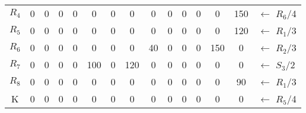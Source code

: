 \documentclass[12pt]{article}
\begin{document}
\begin{enumerate}
\begin{tabular}{|c|c|c|c|c|c|c|c|c|c|c|c|c|c|l}
$R_4$ & 0  & {\color[HTML]{000000} 0}        & {\color[HTML]{000000} 0}        & {\color[HTML]{000000} 0}        & {\color[HTML]{000000} 0}   & {\color[HTML]{000000} 0}   & {\color[HTML]{000000} 0}   & {\color[HTML]{000000} 0}  & {\color[HTML]{000000} 0}   & {\color[HTML]{000000} 0}   & {\color[HTML]{000000} 0}   & {\color[HTML]{000000} 0}   & {\color[HTML]{000000} 150} & ${\leftarrow}$ $R_6$/4 \\ \cline{1-14}
$R_5$ & 0  & {\color[HTML]{000000} 0}        & {\color[HTML]{000000} 0}        & {\color[HTML]{000000} 0}        & {\color[HTML]{000000} 0}   & {\color[HTML]{000000} 0}   & {\color[HTML]{000000} 0}   & {\color[HTML]{000000} 0}  & {\color[HTML]{000000} 0}   & {\color[HTML]{000000} 0}   & {\color[HTML]{000000} 0}   & {\color[HTML]{000000} 0}   & {\color[HTML]{FE0000} 120} & ${\leftarrow}$ $R_1$/3 \\ \cline{1-14}
$R_6$ & 0  & {\color[HTML]{000000} 0}        & {\color[HTML]{000000} 0}        & {\color[HTML]{000000} 0}        & {\color[HTML]{000000} 0}   & {\color[HTML]{000000} 0}   & {\color[HTML]{000000} 0}   & {\color[HTML]{000000} 40} & {\color[HTML]{000000} 0}   & {\color[HTML]{000000} 0}   & {\color[HTML]{000000} 0}   & {\color[HTML]{000000} 150} & {\color[HTML]{000000} 0}   & ${\leftarrow}$ $R_2$/3 \\ \cline{1-14}
$R_7$ & 0  & {\color[HTML]{000000} 0}        & {\color[HTML]{000000} 0}        & {\color[HTML]{000000} 0}        & {\color[HTML]{000000} 100} & {\color[HTML]{000000} 0}   & {\color[HTML]{000000} 120} & {\color[HTML]{000000} 0}  & {\color[HTML]{000000} 0}   & {\color[HTML]{000000} 0}   & {\color[HTML]{000000} 0}   & {\color[HTML]{000000} 0}   & {\color[HTML]{000000} 0}   & ${\leftarrow}$ $S_3$/2 \\ \cline{1-14}
$R_8$ & 0  & {\color[HTML]{000000} 0}        & {\color[HTML]{000000} 0}        & {\color[HTML]{000000} 0}        & {\color[HTML]{000000} 0}   & {\color[HTML]{000000} 0}   & {\color[HTML]{000000} 0}   & {\color[HTML]{000000} 0}  & {\color[HTML]{000000} 0}   & {\color[HTML]{000000} 0}   & {\color[HTML]{000000} 0}   & {\color[HTML]{000000} 0}   & {\color[HTML]{000000} 90}  & ${\leftarrow}$ $R_1$/3 \\ \cline{1-14}
K     & 0  & {\color[HTML]{000000} 0}        & {\color[HTML]{000000} 0}        & {\color[HTML]{000000} 0}        & {\color[HTML]{000000} 0}   & {\color[HTML]{000000} 0}   & {\color[HTML]{000000} 0}   & {\color[HTML]{000000} 0}  & {\color[HTML]{000000} 0}   & {\color[HTML]{000000} 0}   & {\color[HTML]{000000} 0}   & {\color[HTML]{000000} 0}   & {\color[HTML]{000000} 0}   & ${\leftarrow}$ $R_5$/4 \\ \cline{1-14}

\end{tabular}
\end{enumerate}
\end{document}
